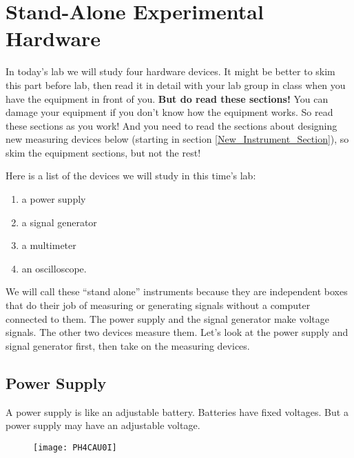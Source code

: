 \section{Stand-Alone Experimental Hardware}

In today's lab we will study four hardware devices. It might be better to skim this part before lab, then read it in detail with your lab group in class when you have the equipment in front of you. \textbf{But do read these sections!} You can damage your equipment if you don't know how the equipment works. So read these sections as you work! And you need to read the sections about  designing new measuring devices below (starting in section \ref*{New_Instrument_Section}), so skim the equipment sections, but not the rest!

Here is a list of the devices we will study in this time's lab:

\begin{enumerate} 
	\item a power supply
	\item a signal generator
	\item a multimeter
	\item an oscilloscope.
\end{enumerate}

We will call these ``stand alone'' instruments because they are independent boxes that do their job of measuring or generating signals without a computer connected to them. The power supply and the signal generator make voltage signals. The other two devices measure them. Let's look at the power supply and signal generator first, then take on the measuring devices.

\subsection{Power Supply}

A power supply is like an adjustable battery. Batteries have fixed voltages. But a power supply may have an adjustable voltage. 

\begin{figure}[h!]
	\centering
	\texttt{[image: PH4CAU0I]}
\end{figure}


